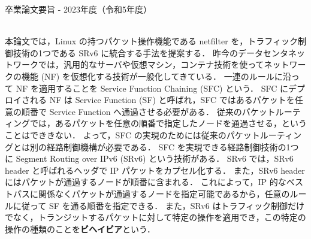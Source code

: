 卒業論文要旨 - 2023年度（令和5年度）
\begin{center}
\begin{large}
\end{large}
\end{center}

~ \\
本論文では，Linux の持つパケット操作機能である netfilter を，トラフィック制御技術の1つである SRv6 に統合する手法を提案する．
昨今のデータセンタネットワークでは，汎用的なサーバや仮想マシン，コンテナ技術を使ってネットワークの機能 (NF) を仮想化する技術が一般化してきている．
一連のルールに沿って NF を適用することを Service Function Chaining (SFC) という．
SFC にデプロイされる NF は Service Function (SF) と呼ばれ，SFC ではあるパケットを任意の順番で Service Function へ通過させる必要がある．
従来のパケットルーティングでは，あるパケットを任意の順番で指定したノードを通過させる，ということはでききない．
よって，SFC の実現のためには従来のパケットルーティングとは別の経路制御機構が必要である．
SFC を実現できる経路制御技術の1つに Segment Routing over IPv6 (SRv6) という技術がある．
SRv6 では，SRv6 header と呼ばれるヘッダで IP パケットをカプセル化する．
また，SRv6 header にはパケットが通過するノードが順番に含まれる．
これによって，IP 的なベストパスに関係なくパケットが通過するノードを指定可能であるから，任意のルールに従って SF を通る順番を指定できる．
また，SRv6 はトラフィック制御だけでなく，トランジットするパケットに対して特定の操作を適用でき，この特定の操作の種類のことを\textbf{ビヘイビア}という．

